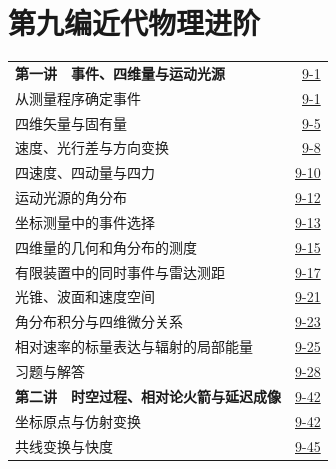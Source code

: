 \section*{第九编\quad 近代物理进阶}
\begin{longtable}{@{}p{}r@{}}
\textbf{第一讲　事件、四维量与运动光源}&\href{course-page:9:5}{9-1}\\[2pt]
\hspace{1em}从测量程序确定事件&\href{course-page:9:5}{9-1}\\[2pt]
\hspace{1em}四维矢量与固有量&\href{course-page:9:9}{9-5}\\[2pt]
\hspace{1em}速度、光行差与方向变换&\href{course-page:9:12}{9-8}\\[2pt]
\hspace{1em}四速度、四动量与四力&\href{course-page:9:14}{9-10}\\[2pt]
\hspace{1em}运动光源的角分布&\href{course-page:9:16}{9-12}\\[2pt]
\hspace{1em}坐标测量中的事件选择&\href{course-page:9:17}{9-13}\\[2pt]
\hspace{1em}四维量的几何和角分布的测度&\href{course-page:9:19}{9-15}\\[2pt]
\hspace{1em}有限装置中的同时事件与雷达测距&\href{course-page:9:21}{9-17}\\[2pt]
\hspace{1em}光锥、波面和速度空间&\href{course-page:9:25}{9-21}\\[2pt]
\hspace{1em}角分布积分与四维微分关系&\href{course-page:9:27}{9-23}\\[2pt]
\hspace{1em}相对速率的标量表达与辐射的局部能量&\href{course-page:9:29}{9-25}\\[2pt]
\hspace{1em}习题与解答&\href{course-page:9:32}{9-28}\\[2pt]
\textbf{第二讲　时空过程、相对论火箭与延迟成像}&\href{course-page:9:46}{9-42}\\[2pt]
\hspace{1em}坐标原点与仿射变换&\href{course-page:9:46}{9-42}\\[2pt]
\hspace{1em}共线变换与快度&\href{course-page:9:49}{9-45}\\[2pt]

\end{longtable}
